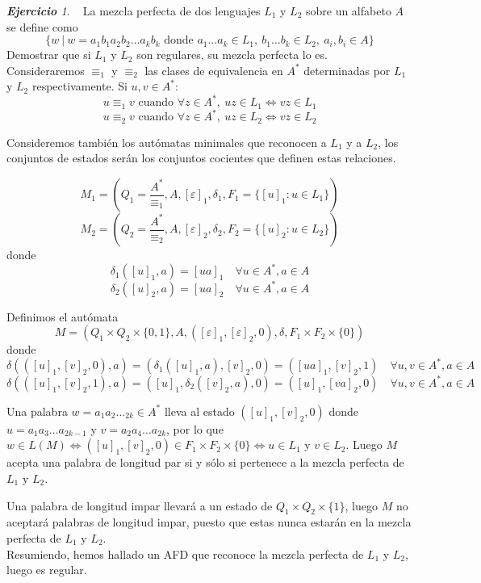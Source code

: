 \documentclass[12pt,spanish]{article}
\theoremstyle{definition}
\theoremstyle{remark}
\newtheorem{exercise}{\textbf{Ejercicio}}%
\begin{document}
\begin{exercise}~ La mezcla perfecta de dos lenguajes $L_1$ y $L_2$
  sobre un alfabeto $A$ se define como
  \[\{w \ | \ w=a_1b_1a_2b_2\ldots a_kb_k \text{ donde } a_1\ldots a_k
    \in L_1, \ b_1\ldots b_k \in L_2, \ a_i,b_i \in A\}\] Demostrar
  que si $L_1$ y $L_2$ son regulares, su mezcla perfecta lo es. \\

  Consideraremos $\equiv_1$ y $\equiv_2$ las clases de equivalencia en
  $A^*$ determinadas por $L_1$ y $L_2$ respectivamente. Si
  $u,v \in A^*$:
  \[u\equiv_1v \text{ cuando } \forall z \in A^*, \ uz \in L_1 \Leftrightarrow vz \in L_1\]
  \[u\equiv_2v \text{ cuando } \forall z \in A^*, \ uz \in L_2 \Leftrightarrow vz \in L_2\]

  Consideremos también los autómatas minimales que reconocen a $L_1$ y
  a $L_2$, los conjuntos de estados serán los conjuntos cocientes que
  definen estas relaciones.

  \[M_1=(Q_1=\frac{A^*}{\equiv_1},A,[\varepsilon]_1,\delta_1,F_1=\{[u]_1: u \in L_1\})\]  
  \[M_2=(Q_2=\frac{A^*}{\equiv_2},A,[\varepsilon]_2,\delta_2,F_2=\{[u]_2: u \in L_2\})\]
  donde
  \[\delta_1([u]_1,a)=[ua]_1 \quad \forall u \in A^*, a \in A\]
  \[\delta_2([u]_2,a)=[ua]_2 \quad \forall u \in A^*, a \in A\]

  Definimos el autómata
  \[M=(Q_1\times Q_2\times \{0,1\},A,([\varepsilon]_1,[\varepsilon]_2,0),\delta,F_1\times F_2\times \{0\})\]
  donde
  \[\delta(([u]_1,[v]_2,0),a)=(\delta_1([u]_1,a),[v]_2,0)=([ua]_1,[v]_2,1) \quad \forall u,v \in A^*, a \in A\]
  \[\delta(([u]_1,[v]_2,1),a)=([u]_1,\delta_2([v]_2,a),0)=([u]_1,[va]_2,0) \quad \forall u,v \in A^*, a \in A\]

  \vspace{3mm}

  Una palabra $w=a_1a_2\ldots _{2k} \in A^*$ lleva al estado
  $([u]_1,[v]_2,0)$ donde $u=a_1a_3\ldots a_{2k-1}$ y
  $v=a_2a_4\ldots a_{2k}$, por lo que
  $w \in L(M) \Leftrightarrow ([u]_1,[v]_2,0) \in F_1\times F_2\times
  \{0\} \Leftrightarrow u \in L_1$ y $v \in L_2$. Luego $M$ acepta una
  palabra de longitud par si y sólo si pertenece a la mezcla perfecta
  de $L_1$ y $L_2$.
  
  Una palabra de longitud impar llevará a un estado de
  $Q_1\times Q_2 \times \{1\}$, luego $M$ no aceptará palabras de
  longitud impar, puesto que estas nunca estarán en la mezcla perfecta
  de $L_1$ y $L_2$. \\

  Resumiendo, hemos hallado un AFD que reconoce la mezcla perfecta de
  $L_1$ y $L_2$, luego es regular.
\end{exercise}
\end{document}
